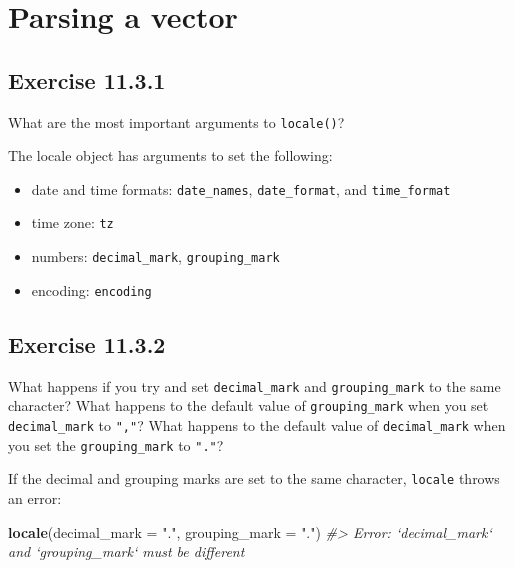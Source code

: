 \documentclass[]{book}
\newenvironment{Shaded}{\begin{snugshade}}{\end{snugshade}}
\newcommand{\CommentTok}[1]{\textcolor[rgb]{0.56,0.35,0.01}{\textit{#1}}}
\newcommand{\DataTypeTok}[1]{\textcolor[rgb]{0.13,0.29,0.53}{#1}}
\newcommand{\KeywordTok}[1]{\textcolor[rgb]{0.13,0.29,0.53}{\textbf{#1}}}
\newcommand{\NormalTok}[1]{#1}
\newcommand{\StringTok}[1]{\textcolor[rgb]{0.31,0.60,0.02}{#1}}
\providecommand{\tightlist}{%
  \setlength{\itemsep}{0pt}\setlength{\parskip}{0pt}}
\theoremstyle{plain}
\theoremstyle{remark}
\theoremstyle{definition}
\theoremstyle{definition}
\theoremstyle{definition}
\theoremstyle{remark}
\begin{document}
\hypertarget{parsing-a-vector}{%
\section{Parsing a vector}\label{parsing-a-vector}}

\hypertarget{exercise-11.3.1}{%
\subsection*{\texorpdfstring{Exercise
{11.3.1}}{Exercise 11.3.1}}\label{exercise-11.3.1}}

What are the most important arguments to \texttt{locale()}?

The locale object has arguments to set the following:

\begin{itemize}
\tightlist
\item
  date and time formats: \texttt{date\_names}, \texttt{date\_format},
  and \texttt{time\_format}
\item
  time zone: \texttt{tz}
\item
  numbers: \texttt{decimal\_mark}, \texttt{grouping\_mark}
\item
  encoding: \texttt{encoding}
\end{itemize}

\hypertarget{exercise-11.3.2}{%
\subsection*{\texorpdfstring{Exercise
{11.3.2}}{Exercise 11.3.2}}\label{exercise-11.3.2}}

What happens if you try and set \texttt{decimal\_mark} and
\texttt{grouping\_mark} to the same character? What happens to the
default value of \texttt{grouping\_mark} when you set
\texttt{decimal\_mark} to \texttt{","}? What happens to the default
value of \texttt{decimal\_mark} when you set the \texttt{grouping\_mark}
to \texttt{"."}?

If the decimal and grouping marks are set to the same character,
\texttt{locale} throws an error:

\begin{Shaded}
\begin{Highlighting}[]
\KeywordTok{locale}\NormalTok{(}\DataTypeTok{decimal_mark =} \StringTok{"."}\NormalTok{, }\DataTypeTok{grouping_mark =} \StringTok{"."}\NormalTok{)}
\CommentTok{#> Error: `decimal_mark` and `grouping_mark` must be different}
\end{Highlighting}
\end{Shaded}
\end{document}
